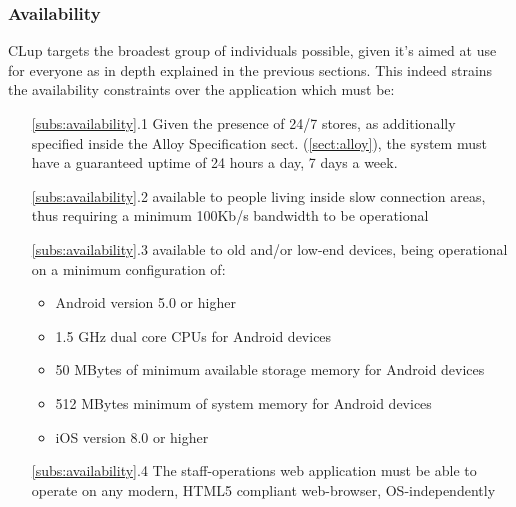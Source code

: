 \subsubsection{Availability \label{subs:availability}}
CLup targets the broadest group of individuals possible, given it's aimed at use for everyone as in depth explained in the previous sections. This indeed strains the availability constraints over the application which must be:\newline
\begin{itemize}[leftmargin=+.8in]
    \item[\ref{subs:availability}.1] Given the presence of 24/7 stores, as additionally specified inside the Alloy Specification sect. (\ref{sect:alloy}), the system must have a guaranteed uptime of 24 hours a day, 7 days a week.
    \item[\ref{subs:availability}.2] available to people living inside slow connection areas, thus requiring a minimum 100Kb/s bandwidth to be operational
    \item[\ref{subs:availability}.3] available to old and/or low-end devices, being operational on a minimum configuration of:
    \begin{itemize}
        \item Android version 5.0 or higher
        \item 1.5 GHz dual core CPUs for Android devices
        \item 50 MBytes of minimum available storage memory for Android devices
        \item 512 MBytes minimum of system memory for Android devices
        \item iOS version 8.0 or higher
    \end{itemize}
    \item[\ref{subs:availability}.4] The staff-operations web application must be able to operate on any modern, HTML5 compliant web-browser, OS-independently 
\end{itemize}
{\color{gray}
}


